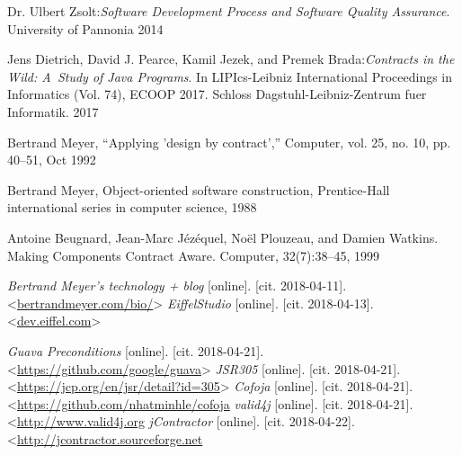\begin{thebibliography}{99}

 Dr. Ulbert Zsolt:\emph{Software Development Process and Software Quality Assurance}. University of Pannonia 2014


 Jens Dietrich, David J. Pearce, Kamil Jezek, and Premek Brada:\emph{Contracts in the Wild: A~Study of Java Programs}. In LIPIcs-Leibniz International Proceedings in Informatics (Vol. 74), ECOOP 2017. Schloss Dagstuhl-Leibniz-Zentrum fuer Informatik. 2017

 Bertrand Meyer, “Applying ’design by contract’,” Computer, vol. 25, no. 10, pp. 40–51, Oct 1992

 Bertrand Meyer, Object-oriented software construction, Prentice-Hall international series in computer science, 1988 

 Antoine Beugnard, Jean-Marc Jézéquel, Noël Plouzeau, and Damien Watkins. Making Components Contract Aware. Computer, 32(7):38–45, 1999


 {\it Bertrand Meyer's technology + blog} [online]. [cit. 2018-04-11]. \textless\url{bertrandmeyer.com/bio/}\textgreater
{} {\it EiffelStudio} [online]. [cit. 2018-04-13]. \textless\url{dev.eiffel.com}\textgreater

 {\it Guava Preconditions} [online]. [cit. 2018-04-21]. \textless\url{https://github.com/google/guava}\textgreater
{} {\it JSR305} [online]. [cit. 2018-04-21]. \textless\url{https://jcp.org/en/jsr/detail?id=305}\textgreater
{} {\it Cofoja} [online]. [cit. 2018-04-21]. \textless\url{https://github.com/nhatminhle/cofoja}
 {\it valid4j} [online]. [cit. 2018-04-21]. \textless\url{http://www.valid4j.org}	
 {\it jContractor} [online]. [cit. 2018-04-22]. \textless\url{http://jcontractor.sourceforge.net}


\end{thebibliography}
